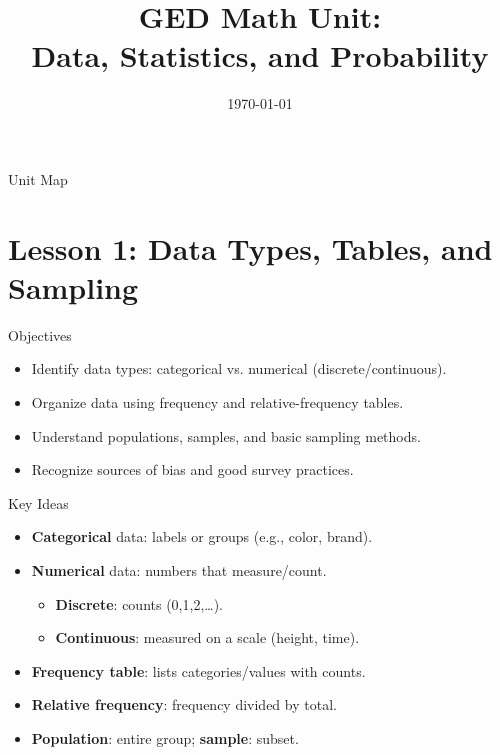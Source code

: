 \documentclass[aspectratio=169]{beamer}
\title[GED Math: Data, Statistics \& Probability]{GED Math Unit:\\Data, Statistics, and Probability}
\institute{Instructor: Paul Fox}
\date{\today}
\begin{document}
\begin{frame}
  \titlepage
\end{frame}

\begin{frame}{Unit Map}
  \tableofcontents
\end{frame}

\section{Lesson 1: Data Types, Tables, and Sampling}

\begin{frame}{Objectives}
\begin{itemize}
  \item Identify data types: categorical vs. numerical (discrete/continuous).
  \item Organize data using frequency and relative-frequency tables.
  \item Understand populations, samples, and basic sampling methods.
  \item Recognize sources of bias and good survey practices.
\end{itemize}
\end{frame}

\begin{frame}{Key Ideas}
\begin{itemize}
  \item \textbf{Categorical} data: labels or groups (e.g., color, brand).
  \item \textbf{Numerical} data: numbers that measure/count.
    \begin{itemize}
      \item \textbf{Discrete}: counts (0,1,2,\ldots).
      \item \textbf{Continuous}: measured on a scale (height, time).
    \end{itemize}
  \item \textbf{Frequency table}: lists categories/values with counts.
  \item \textbf{Relative frequency}: frequency divided by total.
  \item \textbf{Population}: entire group; \textbf{sample}: subset.
\end{itemize}
\end{frame}
\end{document}
